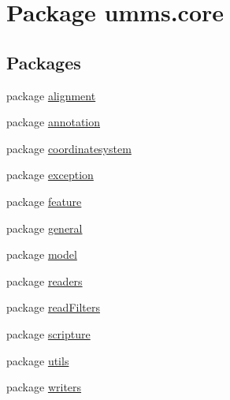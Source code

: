 \hypertarget{namespaceumms_1_1core}{\section{Package umms.\+core}
\label{namespaceumms_1_1core}
}
\subsection*{Packages}
\begin{DoxyCompactItemize}
\item 
package \hyperlink{namespaceumms_1_1core_1_1alignment}{alignment}
\item 
package \hyperlink{namespaceumms_1_1core_1_1annotation}{annotation}
\item 
package \hyperlink{namespaceumms_1_1core_1_1coordinatesystem}{coordinatesystem}
\item 
package \hyperlink{namespaceumms_1_1core_1_1exception}{exception}
\item 
package \hyperlink{namespaceumms_1_1core_1_1feature}{feature}
\item 
package \hyperlink{namespaceumms_1_1core_1_1general}{general}
\item 
package \hyperlink{namespaceumms_1_1core_1_1model}{model}
\item 
package \hyperlink{namespaceumms_1_1core_1_1readers}{readers}
\item 
package \hyperlink{namespaceumms_1_1core_1_1read_filters}{read\+Filters}
\item 
package \hyperlink{namespaceumms_1_1core_1_1scripture}{scripture}
\item 
package \hyperlink{namespaceumms_1_1core_1_1utils}{utils}
\item 
package \hyperlink{namespaceumms_1_1core_1_1writers}{writers}
\end{DoxyCompactItemize}
